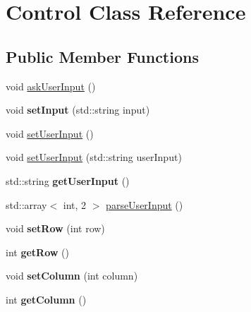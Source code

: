 \hypertarget{class_control}{}\section{Control Class Reference}
\label{class_control}
\subsection*{Public Member Functions}
\begin{DoxyCompactItemize}
\item 
void \hyperlink{class_control_a11fbdd5a8604f786f0a66e29546b2f45}{ask\+User\+Input} ()
\item 
\hypertarget{class_control_a7ab7a3560680957a6d1e6220d64880ee}{}void {\bfseries set\+Input} (std\+::string input)\label{class_control_a7ab7a3560680957a6d1e6220d64880ee}

\item 
void \hyperlink{class_control_aa261d9a11e717cbcbab2d532ae35da3a}{set\+User\+Input} ()
\item 
void \hyperlink{class_control_a55852538e7347ad5f4b5dfe3c6b12f3a}{set\+User\+Input} (std\+::string user\+Input)
\item 
\hypertarget{class_control_af3f0428d94e5aeac47588ee78e99cb86}{}std\+::string {\bfseries get\+User\+Input} ()\label{class_control_af3f0428d94e5aeac47588ee78e99cb86}

\item 
std\+::array$<$ int, 2 $>$ \hyperlink{class_control_a84a631989b53eea689f80fb9bddeff27}{parse\+User\+Input} ()
\item 
\hypertarget{class_control_a4260f26301bdcd2c4f696e6bbbdd9585}{}void {\bfseries set\+Row} (int row)\label{class_control_a4260f26301bdcd2c4f696e6bbbdd9585}

\item 
\hypertarget{class_control_a5731f8cab95d7ee7c03197b99db5c601}{}int {\bfseries get\+Row} ()\label{class_control_a5731f8cab95d7ee7c03197b99db5c601}

\item 
\hypertarget{class_control_a405e0350b3171b2de622f76a3f87f76e}{}void {\bfseries set\+Column} (int column)\label{class_control_a405e0350b3171b2de622f76a3f87f76e}

\item 
\hypertarget{class_control_a7936dac270c7138f77ac079a87defb97}{}int {\bfseries get\+Column} ()\label{class_control_a7936dac270c7138f77ac079a87defb97}

\end{DoxyCompactItemize}


